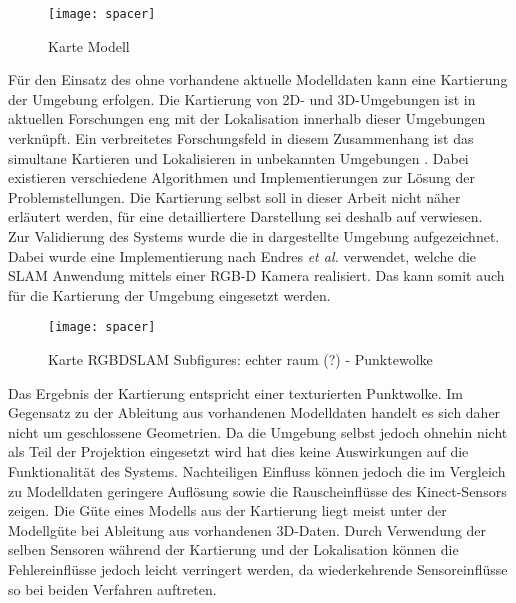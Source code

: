\begin{figure}[ht]
	\begin{center}
		\texttt{[image: spacer]}
		\caption{Karte Modell}
		\label{fig.mapMod}
	\end{center}
\end{figure}

Für den Einsatz des  ohne vorhandene aktuelle Modelldaten kann eine Kartierung \red[(Mapping)] der Umgebung erfolgen. Die Kartierung von 2D- und 3D-Umgebungen ist in aktuellen Forschungen eng mit der Lokalisation innerhalb dieser Umgebungen verknüpft. Ein verbreitetes Forschungsfeld in diesem Zusammenhang ist das simultane Kartieren und Lokalisieren in unbekannten Umgebungen . Dabei existieren verschiedene Algorithmen und Implementierungen zur Lösung der Problemstellungen. Die Kartierung selbst soll in dieser Arbeit nicht näher erläutert werden, für eine detailliertere Darstellung sei deshalb auf  verwiesen.\\

Zur Validierung des Systems wurde die in  dargestellte Umgebung aufgezeichnet. Dabei wurde eine Implementierung \cite{Rgbdslam} nach Endres \textit{et al.} \cite{Endres2014} verwendet, welche die SLAM Anwendung mittels einer RGB-D Kamera realisiert. Das \kps{} kann somit auch für die Kartierung der Umgebung eingesetzt werden.\\

\begin{figure}[ht]
	\begin{center}
		\texttt{[image: spacer]}
		\caption{Karte RGBDSLAM Subfigures: echter raum (?) - Punktewolke}
		\label{fig.mapSLAM}
	\end{center}
\end{figure}

Das Ergebnis der Kartierung entspricht einer texturierten Punktwolke. Im Gegensatz zu der Ableitung aus vorhandenen Modelldaten handelt es sich daher nicht um geschlossene Geometrien. Da die Umgebung selbst jedoch ohnehin nicht als Teil der Projektion eingesetzt wird hat dies keine Auswirkungen auf die Funktionalität des Systems. Nachteiligen Einfluss können jedoch die im Vergleich zu Modelldaten geringere Auflösung sowie die Rauscheinflüsse des Kinect-Sensors zeigen. Die Güte eines Modells aus der Kartierung liegt meist unter der Modellgüte bei Ableitung aus vorhandenen 3D-Daten. Durch Verwendung der selben Sensoren während der Kartierung und der Lokalisation können die Fehlereinflüsse jedoch leicht verringert werden, da wiederkehrende Sensoreinflüsse so bei beiden Verfahren auftreten.\\

